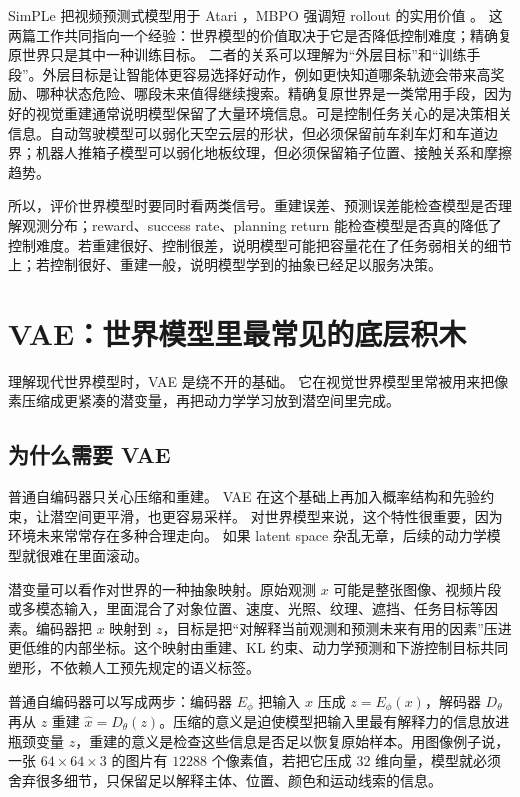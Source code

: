 \documentclass[11pt,a4paper]{ctexart}
\begin{document}
SimPLe 把视频预测式模型用于 Atari \cite{kaiser2019simple}，MBPO 强调短 rollout 的实用价值 \cite{janner2019mbpo}。
这两篇工作共同指向一个经验：世界模型的价值取决于它是否降低控制难度；精确复原世界只是其中一种训练目标。
二者的关系可以理解为“外层目标”和“训练手段”。外层目标是让智能体更容易选择好动作，例如更快知道哪条轨迹会带来高奖励、哪种状态危险、哪段未来值得继续搜索。精确复原世界是一类常用手段，因为好的视觉重建通常说明模型保留了大量环境信息。可是控制任务关心的是决策相关信息。自动驾驶模型可以弱化天空云层的形状，但必须保留前车刹车灯和车道边界；机器人推箱子模型可以弱化地板纹理，但必须保留箱子位置、接触关系和摩擦趋势。

所以，评价世界模型时要同时看两类信号。重建误差、预测误差能检查模型是否理解观测分布；reward、success rate、planning return 能检查模型是否真的降低了控制难度。若重建很好、控制很差，说明模型可能把容量花在了任务弱相关的细节上；若控制很好、重建一般，说明模型学到的抽象已经足以服务决策。

\section{VAE：世界模型里最常见的底层积木}

理解现代世界模型时，VAE 是绕不开的基础。
它在视觉世界模型里常被用来把像素压缩成更紧凑的潜变量，再把动力学学习放到潜空间里完成。

\subsection{为什么需要 VAE}

普通自编码器只关心压缩和重建。
VAE 在这个基础上再加入概率结构和先验约束，让潜空间更平滑，也更容易采样。
对世界模型来说，这个特性很重要，因为环境未来常常存在多种合理走向。
如果 latent space 杂乱无章，后续的动力学模型就很难在里面滚动。

潜变量可以看作对世界的一种抽象映射。原始观测 $x$ 可能是整张图像、视频片段或多模态输入，里面混合了对象位置、速度、光照、纹理、遮挡、任务目标等因素。编码器把 $x$ 映射到 $z$，目标是把“对解释当前观测和预测未来有用的因素”压进更低维的内部坐标。这个映射由重建、KL 约束、动力学预测和下游控制目标共同塑形，不依赖人工预先规定的语义标签。

普通自编码器可以写成两步：编码器 $E_\phi$ 把输入 $x$ 压成 $z=E_\phi(x)$，解码器 $D_\theta$ 再从 $z$ 重建 $\hat x=D_\theta(z)$。压缩的意义是迫使模型把输入里最有解释力的信息放进瓶颈变量 $z$，重建的意义是检查这些信息是否足以恢复原始样本。用图像例子说，一张 $64\times64\times3$ 的图片有 $12288$ 个像素值，若把它压成 $32$ 维向量，模型就必须舍弃很多细节，只保留足以解释主体、位置、颜色和运动线索的信息。
\end{document}
